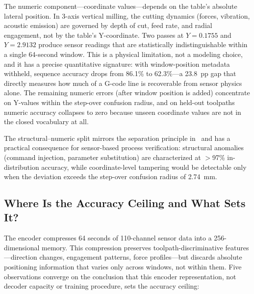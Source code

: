 \documentclass[sensors,article,submit,moreauthors,pdftex]{Definitions/mdpi}
\begin{document}
The numeric component---coordinate values---depends on the table's absolute lateral position. In 3-axis vertical milling, the cutting dynamics (forces, vibration, acoustic emission) are governed by depth of cut, feed rate, and radial engagement, not by the table's Y-coordinate. Two passes at $Y = 0.1755$ and $Y = 2.9132$ produce sensor readings that are statistically indistinguishable within a single 64-second window. This is a physical limitation, not a modeling choice, and it has a precise quantitative signature: with window-position metadata withheld, sequence accuracy drops from 86.1\% to 62.3\%---a 23.8~pp gap that directly measures how much of a G-code line is recoverable from sensor physics alone. The remaining numeric errors (after window position is added) concentrate on Y-values within the step-over confusion radius, and on held-out toolpaths numeric accuracy collapses to zero because unseen coordinate values are not in the closed vocabulary at all.

The structural--numeric split mirrors the separation principle in~\cite{grammar_paper} and has a practical consequence for sensor-based process verification: structural anomalies (command injection, parameter substitution) are characterized at $>$97\% in-distribution accuracy, while coordinate-level tampering would be detectable only when the deviation exceeds the step-over confusion radius of 2.74~mm.

\subsection{Where Is the Accuracy Ceiling and What Sets It?}

The encoder compresses 64 seconds of 110-channel sensor data into a 256-dimensional memory. This compression preserves toolpath-discriminative features---direction changes, engagement patterns, force profiles---but discards absolute positioning information that varies only across windows, not within them. Five observations converge on the conclusion that this encoder representation, not decoder capacity or training procedure, sets the accuracy ceiling:
\end{document}
